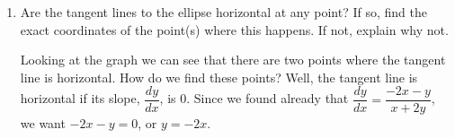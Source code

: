 \documentclass{article}
\begin{document}
\begin{enumerate}
\begin{enumerate}
    \begin{solution}
      Looking at the graph, the tangent lines certainly appear to be
      parallel.  To be sure, we should compute the slopes of the tangent
      lines.  This is easy since we calculated in
      \ref{spring2009-xb-midterm1-5a} that $\dfrac{dy}{dx} =
      \dfrac{-2x-y}{x+2y}$.  At $(0, \sqrt{3})$ we have $\displaystyle
      \frac{dy}{dx} = \frac{-\sqrt{3}}{2\sqrt{3}} = -\frac{1}{2}$, and at
      $(0, -\sqrt{3})$ we have $\displaystyle \frac{dy}{dx} =
      \frac{\sqrt{3}}{-2\sqrt{3}} = -\frac{1}{2}$. So, the two tangent
      lines are parallel.
    \end{solution}

  \item
    \begin{problem}[\vfill\newpage]
      Are the tangent lines to the ellipse horizontal at any point? If so,
      find the exact coordinates of the point(s) where this happens. If
      not, explain why not.
    \end{problem}

    \begin{solution}
      Looking at the graph we can see that there are two points where the
      tangent line is horizontal.  How do we find these points?  Well, the
      tangent line is horizontal if its slope, $\dfrac{dy}{dx}$, is 0.
      Since we found already that $\dfrac{dy}{dx} = \dfrac{-2x - y}{x +
        2y}$, we want $-2x - y = 0$, or $y = -2x$.


\end{solution}
\end{enumerate}
\end{enumerate}
\end{document}
